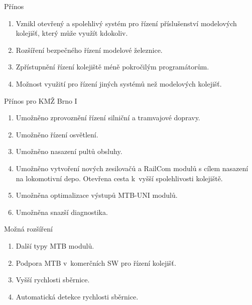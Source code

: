 \documentclass[aspectratio=169]{beamer}
\begin{document}
\begin{frame}{Přínos}
\begin{enumerate}
	\item Vznikl otevřený a spolehlivý systém pro řízení příslušenství modelových
		kolejišť, který může využít kdokoliv.
	\item Rozšíření bezpečného řízení modelové železnice.
	\item Zpřístupnění řízení kolejiště méně pokročilým programátorům.
	\item Možnost využití pro řízení jiných systémů než modelových kolejišť.
\end{enumerate}

\begin{alertblock}{Přínos pro KMŽ Brno I}
\begin{enumerate}
\item Umožněno zprovoznění řízení silniční a tramvajové dopravy.
\item Umožněno řízení osvětlení.
\item Umožněno nasazení pultů obsluhy.
\item Umožněno vytvoření nových zesilovačů a RailCom modulů s cílem nasazení
	na lokomotivní depo. Otevřena cesta k vyšší spolehlivosti kolejiště.
\item Umožněna optimalizace výstupů MTB-UNI modulů.
\item Umožněna snazší diagnostika.
\end{enumerate}
\end{alertblock}
\end{frame}

\begin{frame}{Možná rozšíření}
\begin{enumerate}
\item Další typy MTB modulů.
\item Podpora MTB v komerčních SW pro řízení kolejišť.
\item Vyšší rychlosti sběrnice.
\item Automatická detekce rychlosti sběrnice.
\end{enumerate}
\end{frame}

\end{document}
